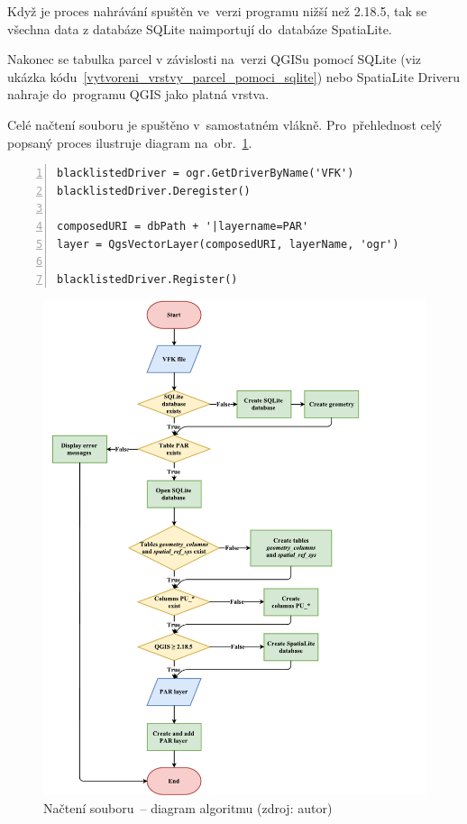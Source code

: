 Když je proces nahrávání spuštěn ve~verzi programu nižší než 2.18.5, tak
se všechna data z databáze SQLite naimportují do~databáze SpatiaLite.

Nakonec se tabulka parcel v závislosti na~verzi QGISu pomocí SQLite
(viz ukázka kódu~\ref{vytvoreni_vrstvy_parcel_pomoci_sqlite}) nebo
SpatiaLite Driveru nahraje do~programu QGIS jako platná vrstva.

Celé načtení  souboru je spuštěno v~samostatném
vlákně. Pro~přehlednost celý popsaný proces ilustruje diagram
na~obr.~\ref{fig:diagram_nacitani_vfk}.

{\scriptsize
\begin{lstlisting}[style=python, caption={Vytvoření QGIS vrstvy parcel
pomocí SQLite Driveru}, captionpos=b,
label=vytvoreni_vrstvy_parcel_pomoci_sqlite, backgroundcolor =
\color{light-gray}, numbers=left]
blacklistedDriver = ogr.GetDriverByName('VFK')
blacklistedDriver.Deregister()

composedURI = dbPath + '|layername=PAR'
layer = QgsVectorLayer(composedURI, layerName, 'ogr')

blacklistedDriver.Register()
\end{lstlisting}}

	\begin{figure}[H] \centering
		\includegraphics[width=1.2\textwidth]{./pictures/nacitani_vfk_souboru.pdf}
		\caption[Načtení  souboru~– diagram
algoritmu]{Načtení  souboru~– diagram algoritmu (zdroj: autor)}
		\label{fig:diagram_nacitani_vfk}
 	\end{figure}

